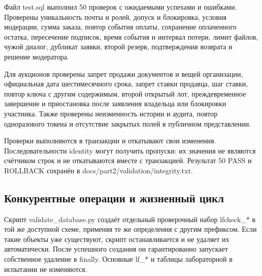 Файл test.sql выполнил 50 проверок с ожидаемыми успехами и ошибками. Проверены уникальность почты и ролей, допуск и блокировка, условия модерации, сумма заказа, повтор события оплаты, сохранение оплаченного остатка, пересечение подписок, время события и интервал потери, лимит файлов, чужой диалог, дубликат заявки, второй резерв, подтверждения возврата и решение модератора.

Для аукционов проверены запрет продажи документов и вещей организации, официальная дата шестимесячного срока, запрет ставки продавца, шаг ставки, повтор ключа с другим содержимым, второй открытый лот, преждевременное завершение и приостановка после заявления владельца или блокировки участника. Также проверены неизменность истории и аудита, повтор одноразового токена и отсутствие закрытых полей в публичном представлении.

Проверки выполняются в транзакции и откатывают свои изменения. Последовательности identity могут получить пропуски: их значения не являются счётчиком строк и не откатываются вместе с транзакцией. Результат 50 PASS и ROLLBACK сохранён в docs/\allowbreak{}part2/\allowbreak{}validation/\allowbreak{}integrity.txt.

\FloatBarrier
{}
\subsection{Конкурентные операции и жизненный цикл}

Скрипт validate\_\allowbreak{}database.py создаёт отдельный проверочный набор lfcheck\_\allowbreak{}* в той же доступной схеме, применяя те же определения с другим префиксом. Если такие объекты уже существуют, скрипт останавливается и не удаляет их автоматически. После успешного создания он гарантированно запускает собственное удаление в finally. Основные lf\_\allowbreak{}* и таблицы лабораторной в испытании не изменяются.

